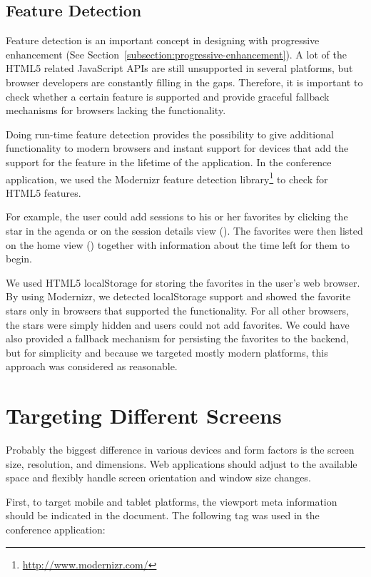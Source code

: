 \subsection{Feature Detection}
\label{section:feature-detection}

Feature detection is an important concept in designing with
progressive enhancement (See
Section~\ref{subsection:progressive-enhancement}). A lot of the HTML5
related JavaScript APIs are still unsupported in several platforms,
but browser developers are constantly filling in the gaps. Therefore,
it is important to check whether a certain feature is supported and
provide graceful fallback mechanisms for browsers lacking the
functionality.

Doing run-time feature detection provides the possibility to give
additional functionality to modern browsers and instant support for
devices that add the support for the feature in the lifetime of the
application. In the conference application, we used the Modernizr
feature detection library\footnote{\url{http://www.modernizr.com/}} to
check for HTML5 features.

For example, the user could add sessions to his or her favorites by
clicking the star in the agenda or on the session details view
(). The favorites were then listed on the home
view () together with information about the time
left for them to begin.

We used HTML5 localStorage for storing the favorites in the user's web
browser. By using Modernizr, we detected localStorage support and
showed the favorite stars only in browsers that supported the
functionality. For all other browsers, the stars were simply hidden
and users could not add favorites. We could have also provided a
fallback mechanism for persisting the favorites to the backend, but
for simplicity and because we targeted mostly modern platforms, this
approach was considered as reasonable.

\section{Targeting Different Screens}
\label{section:targeting-screens}

Probably the biggest difference in various devices and form factors is
the screen size, resolution, and dimensions. Web applications should
adjust to the available space and flexibly handle screen orientation
and window size changes.

First, to target mobile and tablet platforms, the viewport meta
information should be indicated in the document. The following tag was
used in the conference application:

